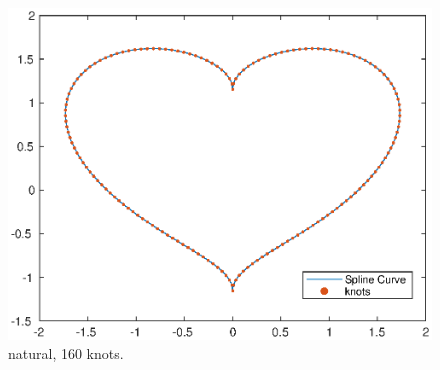 \documentclass[11pt,en]{elegantpaper}
\begin{document}
\begin{figure}[htbp]
\begin{minipage}[t]{0.33\linewidth}
        \includegraphics[width=0.95\linewidth]{figure/assE_160knots.eps}
        \caption{natural, 160 knots.}
        \label{fig:side:c}
    \end{minipage}%
\end{figure}
\end{document}
